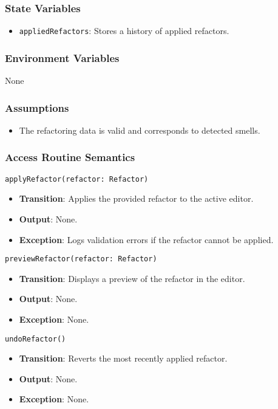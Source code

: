 \documentclass[12pt, titlepage]{article}
\begin{document}
\subsubsection{State Variables}
\begin{itemize}
\item \texttt{appliedRefactors}: Stores a history of applied refactors.
\end{itemize}

\subsubsection{Environment Variables}
None


\subsubsection{Assumptions}
\begin{itemize}
\item The refactoring data is valid and corresponds to detected smells.
\end{itemize}

\subsubsection{Access Routine Semantics}
\texttt{applyRefactor(refactor: Refactor)}
\begin{itemize}
\item \textbf{Transition}: Applies the provided refactor to the active editor.
\item \textbf{Output}: None.
\item \textbf{Exception}: Logs validation errors if the refactor cannot be applied.
\end{itemize}

\texttt{previewRefactor(refactor: Refactor)}
\begin{itemize}
\item \textbf{Transition}: Displays a preview of the refactor in the editor.
\item \textbf{Output}: None.
\item \textbf{Exception}: None.
\end{itemize}

\texttt{undoRefactor()}
\begin{itemize}
\item \textbf{Transition}: Reverts the most recently applied refactor.
\item \textbf{Output}: None.
\item \textbf{Exception}: None.
\end{itemize}
\end{document}
